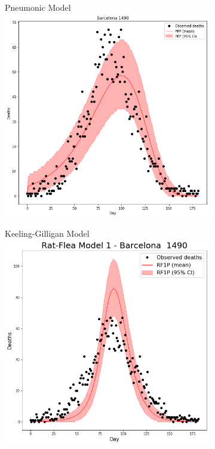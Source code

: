 \documentclass [letterpaper, 12pt] {article}
\begin{document}
\begin{figure}[H]
	\begin{subfigure}{0.48\textwidth}
	\centering
	Pneumonic Model
	\includegraphics[width=\linewidth]{pneum_barcelona.png}
	\end{subfigure}\hspace{\fill}
	\begin{subfigure}{0.48\textwidth}
	\centering
	Keeling-Gilligan Model
	\includegraphics[width=\linewidth]{rats1_barcelona.png}

\end{subfigure}
\end{figure}
\end{document}

